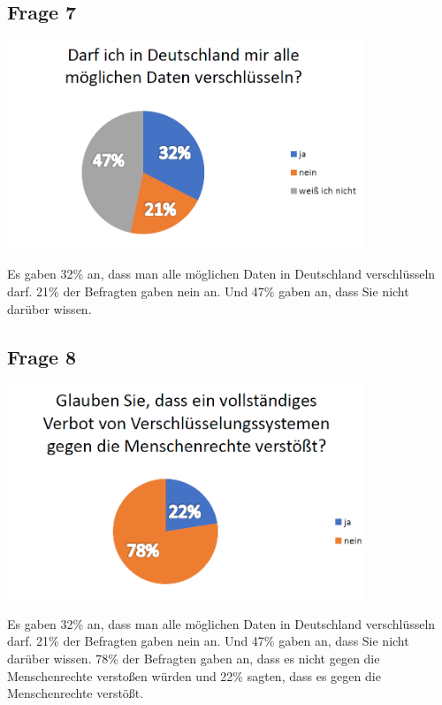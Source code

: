 \subsection{Frage 7}
\begin{center}
	\includegraphics[width=0.8\textwidth]{./img/umfrage7}
\end{center}
Es gaben 32\% an, dass man alle möglichen Daten in Deutschland verschlüsseln darf. 21\% der Befragten gaben nein an. Und 47\% gaben an, dass Sie nicht darüber wissen.



\subsection{Frage 8}
\begin{center}
	\includegraphics[width=0.8\textwidth]{./img/umfrage8}
\end{center}
Es gaben 32\% an, dass man alle möglichen Daten in Deutschland verschlüsseln darf. 21\% der Befragten gaben nein an. Und 47\% gaben an, dass Sie nicht darüber wissen.
78\% der Befragten gaben an, dass es nicht gegen die Menschenrechte verstoßen würden und 22\% sagten, dass es gegen die Menschenrechte verstößt.

